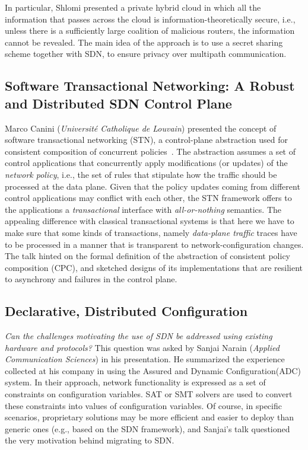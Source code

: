 \documentclass[11pt,pdftex,letter]{article}
\begin{document}
In particular, Shlomi presented a private hybrid cloud in which all the information that passes across the cloud is information-theoretically
secure, i.e., unless there is a sufficiently large coalition of malicious routers, the information cannot be revealed.
The main idea of the approach is to use a
secret sharing scheme together with SDN, to ensure privacy over
multipath communication.


\subsection{Software Transactional Networking: A Robust and
  Distributed SDN Control Plane}

Marco Canini ({\em Universit\'{e} Catholique de Louvain}) presented the concept of software transactional
networking (STN), a control-plane abstraction used for consistent
composition of concurrent policies~\cite{stn}. The abstraction assumes a set of
control applications that concurrently apply modifications (or
updates) of the
\emph{network policy}, i.e., the set of rules that stipulate how the
traffic should be processed at the data plane.
Given that the policy updates coming from different control applications may
conflict with each other, the STN framework offers to the applications
a \emph{transactional} interface with \emph{all-or-nothing} semantics.
The appealing difference with classical transactional systems is that
here we have to make sure that some kinds of transactions, namely
\emph{data-plane traffic} traces have to be processed in a manner that
is transparent to network-configuration changes.
The talk hinted on the formal definition of the abstraction of consistent policy
composition (CPC), and sketched designs of its implementations that
are resilient to asynchrony and failures in the control plane.

\subsection{Declarative, Distributed Configuration}

\emph{Can the challenges motivating the use of SDN be addressed using
existing hardware and protocols?} This question was  asked
by Sanjai Narain ({\em Applied Communication Sciences}) in his presentation.
He
summarized the
experience collected at his company in using the Assured and Dynamic
Configuration(ADC) system. In their approach, network functionality is
expressed as a set of constraints on configuration variables. SAT or
SMT solvers are used to convert these constraints into values of configuration variables.
Of course, in specific scenarios, proprietary solutions may be more
efficient and  easier to deploy than generic ones (e.g., based on the
SDN framework), and Sanjai's talk questioned the very
motivation behind migrating to SDN.
\end{document}
